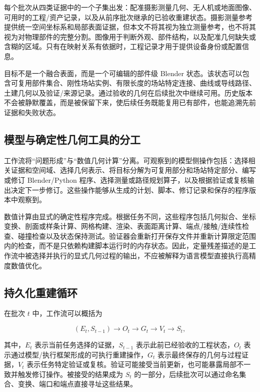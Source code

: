 \documentclass[10pt,a4paper]{article}
\begin{document}
每个批次从四类证据中的一个子集出发：配准摄影测量几何、无人机或地面图像、可用时的工程/资产记录，以及从前序批次继承的已验收重建状态。摄影测量参考提供统一空间坐标系和局部表面证据，但本文不将其视为独立测量参考，也不将其视为对物理部件的完整分割。图像用于判断外观、部件结构，以及配准几何缺失或含糊的区域。只有在映射关系有依据时，工程记录才用于提供设备身份或配置信息。

目标不是一个融合表面，而是一个可编辑的部件级 Blender
状态。该状态可以包含可复用部件集合、刚性场站实例、有限长度的场站特定连接、曲线或导线路径、土建几何以及验证/来源记录。通过验收的几何在后续批次中继续可用。历史版本不会被静默覆盖，而是被保留下来，使后续任务既能复用已有部件，也能追溯先前证据和失败状态。

\hypertarget{ux6a21ux578bux4e0eux786eux5b9aux6027ux51e0ux4f55ux5de5ux5177ux7684ux5206ux5de5}{%
\subsection{模型与确定性几何工具的分工}\label{ux6a21ux578bux4e0eux786eux5b9aux6027ux51e0ux4f55ux5de5ux5177ux7684ux5206ux5de5}}

工作流将``问题形成''与``数值几何计算''分离。可观察到的模型侧操作包括：选择相关证据和空间域、选择几何表示、将目标分解为可复用部分和场站特定部分、编写或修订
Blender/Python
程序、选择测量或路径规划算子，以及根据验证或复核输出决定下一步修订。这些操作能够从生成的计划、脚本、修订记录和保存的程序版本中观察到。

数值计算由显式的确定性程序完成。根据任务不同，这些程序包括几何拟合、坐标变换、剖面或样条计算、网格构建、渲染、表面距离计算、端点/接触/连续性检查、碰撞检查以及状态保持测试。验证器会重新打开保存文件并重新计算限定范围内的检查，而不是只依赖构建脚本运行时的内存状态。因此，定量残差描述的是工作流中被选择并执行的显式几何过程的输出，不应被解释为语言模型直接执行高精度数值优化。

\hypertarget{ux6301ux4e45ux5316ux91cdux5efaux5faaux73af}{%
\subsection{持久化重建循环}\label{ux6301ux4e45ux5316ux91cdux5efaux5faaux73af}}

在批次 \(t\) 中，工作流可以概括为

\[
(E_t, S_{t-1}) \rightarrow O_t \rightarrow G_t \rightarrow V_t \rightarrow S_t,
\]

其中，\(E_t\) 表示当前任务选择的证据，\(S_{t-1}\)
表示此前已经验收的工程状态，\(O_t\)
表示通过模型/执行框架形成的可执行重建操作，\(G_t\)
表示最终保存的几何与过程证据，\(V_t\)
表示任务特定验证或复核。验证可能接受当前更新，也可能暴露局部不一致并触发修订操作。被接受的结果成为
\(S_t\)
的一部分，后续批次可以通过命名集合、变换、端口和端点直接寻址这些结果。
\end{document}
